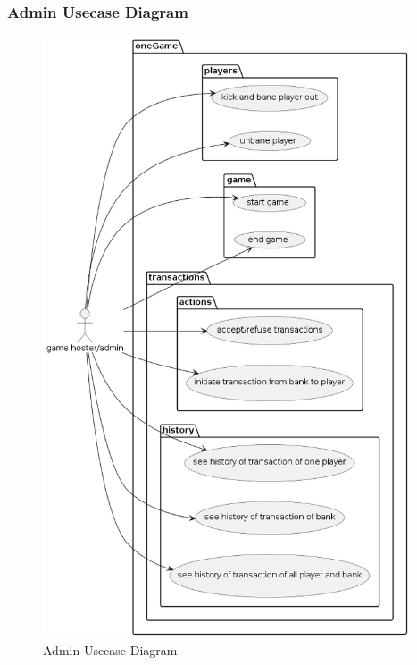\documentclass{article}
\begin{document}
\cleardoublepage
\subsubsection{Admin Usecase Diagram}
 \begin{figure}[H]
	 \centering
	 \includegraphics[height=7in]{../thesis_tex/assets/diagrams/admin_ucd.png}
	 \caption{Admin Usecase Diagram}
\end{figure}
\cleardoublepage

\cleardoublepage
\end{document}
